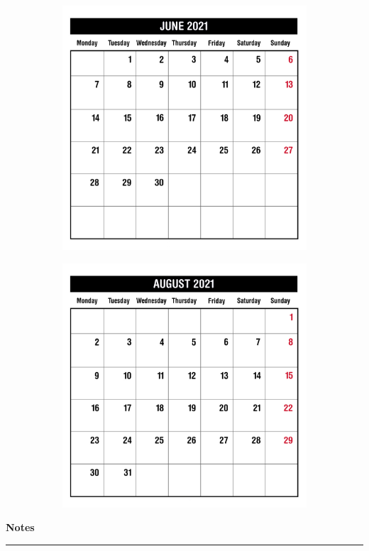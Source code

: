 \begin{figure}[H]
\begin{subfigure}[l]{0.5\textwidth}
    \includegraphics[width=\textwidth]{Sources/MonthViews/June21.jpg}
  \end{subfigure}
  \begin{subfigure}[l]{0.5\textwidth}
    \includegraphics[width=\textwidth]{Sources/MonthViews/August21.jpg}
  \end{subfigure}
\end{figure}


\newpage
\begin{notesbox}
\textbf{Notes} \\
\rule{\linewidth}{0.02cm}
\end{notesbox}